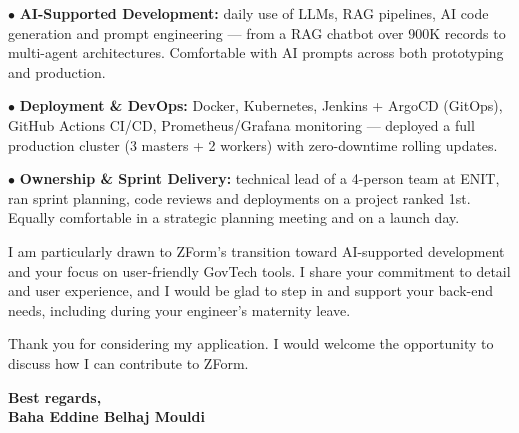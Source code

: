 \documentclass[a4paper,11pt]{article}
\begin{document}
$\bullet$ \textbf{AI-Supported Development:} daily use of LLMs, RAG pipelines, AI code generation and prompt engineering --- from a RAG chatbot over 900K records to multi-agent architectures. Comfortable with AI prompts across both prototyping and production.

$\bullet$ \textbf{Deployment \& DevOps:} Docker, Kubernetes, Jenkins + ArgoCD (GitOps), GitHub Actions CI/CD, Prometheus/Grafana monitoring --- deployed a full production cluster (3 masters + 2 workers) with zero-downtime rolling updates.

$\bullet$ \textbf{Ownership \& Sprint Delivery:} technical lead of a 4-person team at ENIT, ran sprint planning, code reviews and deployments on a project ranked 1st. Equally comfortable in a strategic planning meeting and on a launch day.

I am particularly drawn to ZForm's transition toward AI-supported development and your focus on user-friendly GovTech tools. I share your commitment to detail and user experience, and I would be glad to step in and support your back-end needs, including during your engineer's maternity leave.

Thank you for considering my application. I would welcome the opportunity to discuss how I can contribute to ZForm.

\vspace{0.8cm}

\begin{flushright}
{\bfseries Best regards,}\\[0.3cm]
{\bfseries Baha Eddine Belhaj Mouldi}
\end{flushright}
\end{document}
